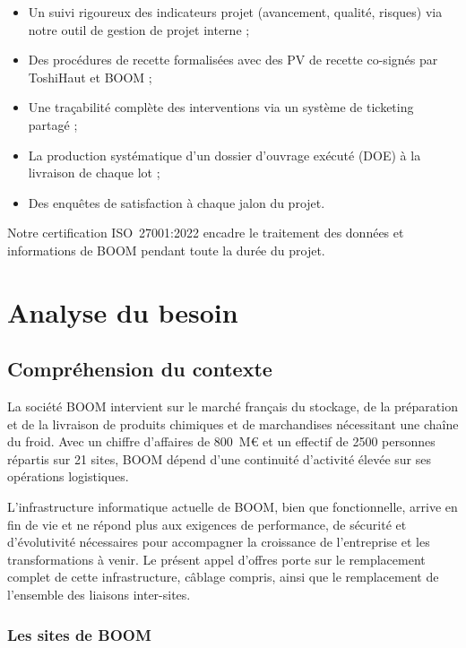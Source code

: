 \documentclass[12pt,a4paper]{report}
\begin{document}
\begin{itemize}
\item Un suivi rigoureux des indicateurs projet (avancement, qualité, risques) via notre outil de gestion de projet interne ;
\item Des procédures de recette formalisées avec des PV de recette co-signés par ToshiHaut et BOOM ;
\item Une traçabilité complète des interventions via un système de ticketing partagé ;
\item La production systématique d'un dossier d'ouvrage exécuté (DOE) à la livraison de chaque lot ;
\item Des enquêtes de satisfaction à chaque jalon du projet.
\end{itemize}

Notre certification ISO~27001:2022 encadre le traitement des données et informations de BOOM pendant toute la durée du projet.


\chapter{Analyse du besoin}

\section{Compréhension du contexte}

La société BOOM intervient sur le marché français du stockage, de la préparation et de la livraison de produits chimiques et de marchandises nécessitant une chaîne du froid. Avec un chiffre d'affaires de 800~M\euro{} et un effectif de 2500 personnes répartis sur 21 sites, BOOM dépend d'une continuité d'activité élevée sur ses opérations logistiques.

L'infrastructure informatique actuelle de BOOM, bien que fonctionnelle, arrive en fin de vie et ne répond plus aux exigences de performance, de sécurité et d'évolutivité nécessaires pour accompagner la croissance de l'entreprise et les transformations à venir. Le présent appel d'offres porte sur le remplacement complet de cette infrastructure, câblage compris, ainsi que le remplacement de l'ensemble des liaisons inter-sites.

\subsection{Les sites de BOOM}
\end{document}
